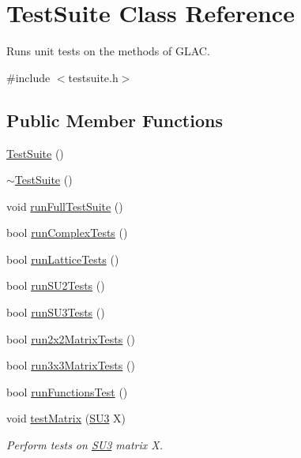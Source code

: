 \hypertarget{class_test_suite}{}\section{Test\+Suite Class Reference}
\label{class_test_suite}


Runs unit tests on the methods of G\+L\+AC.  




{\ttfamily \#include $<$testsuite.\+h$>$}

\subsection*{Public Member Functions}
\begin{DoxyCompactItemize}
\item 
\mbox{\hyperlink{class_test_suite_af7291e6d8b53443604ee0c1fcf1fadfc}{Test\+Suite}} ()
\item 
\mbox{\hyperlink{class_test_suite_a1a4603e985169c62d251876dd3910b5e}{$\sim$\+Test\+Suite}} ()
\item 
void \mbox{\hyperlink{class_test_suite_a0fa7e788a1b1c235faa475c0d1aaa1e3}{run\+Full\+Test\+Suite}} ()
\item 
bool \mbox{\hyperlink{class_test_suite_a0597dcd7c68390ac33d8095f2a76ae0f}{run\+Complex\+Tests}} ()
\item 
bool \mbox{\hyperlink{class_test_suite_aa24e7ab393007d18d027fe95c5a3ec58}{run\+Lattice\+Tests}} ()
\item 
bool \mbox{\hyperlink{class_test_suite_a904ac34cad4166c281f7dbce9a682b2c}{run\+S\+U2\+Tests}} ()
\item 
bool \mbox{\hyperlink{class_test_suite_a7e884438760a81f7f4da7831043f88b0}{run\+S\+U3\+Tests}} ()
\item 
bool \mbox{\hyperlink{class_test_suite_acf6d1ad1920132a4aed74457bb2df8cb}{run2x2\+Matrix\+Tests}} ()
\item 
bool \mbox{\hyperlink{class_test_suite_a91444c36a86d453cc9922d888b248a6b}{run3x3\+Matrix\+Tests}} ()
\item 
bool \mbox{\hyperlink{class_test_suite_af257c555a7fff6934523f80b9c59309c}{run\+Functions\+Test}} ()
\item 
void \mbox{\hyperlink{class_test_suite_ab5f5915eeeca7674592c8f170948f43d}{test\+Matrix}} (\mbox{\hyperlink{class_s_u3}{S\+U3}} X)
\begin{DoxyCompactList}\small\item\em Perform tests on \mbox{\hyperlink{class_s_u3}{S\+U3}} matrix X. \end{DoxyCompactList}\end{DoxyCompactItemize}


